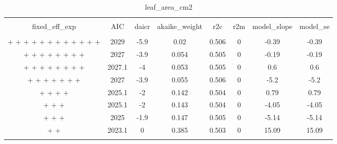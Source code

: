 
\begin{table}[!htbp] \centering 
  \caption{leaf_area_cm2} 
  \label{leaf_area_cm2} 
\begin{tabular}{@{\extracolsep{5pt}} cccccccc} 
\\[-1.8ex]\hline 
\hline \\[-1.8ex] 
fixed\_eff\_exp & AIC & daicr & akaike\_weight & r2c & r2m & model\_slope & model\_se \\ 
\hline \\[-1.8ex] 
 +  +  +  +  +  +  +  +  +  +  +  +  & 2029 & -5.9 & 0.02 & 0.506 & 0 & -0.39 & -0.39 \\ 
 +  +  +  +  +  +  +  +  & 2027 & -3.9 & 0.054 & 0.505 & 0 & -0.19 & -0.19 \\ 
 +  +  +  +  +  +  +  +  & 2027.1 & -4 & 0.053 & 0.505 & 0 & 0.6 & 0.6 \\ 
 +  +  +  +  +  +  +  & 2027 & -3.9 & 0.055 & 0.506 & 0 & -5.2 & -5.2 \\ 
 +  +  +  +  & 2025.1 & -2 & 0.142 & 0.504 & 0 & 0.79 & 0.79 \\ 
 +  +  +  & 2025.1 & -2 & 0.143 & 0.504 & 0 & -4.05 & -4.05 \\ 
 +  +  +  & 2025 & -1.9 & 0.147 & 0.505 & 0 & -5.14 & -5.14 \\ 
 +  +  & 2023.1 & 0 & 0.385 & 0.503 & 0 & 15.09 & 15.09 \\ 
\hline \\[-1.8ex] 
\end{tabular} 
\end{table} 
